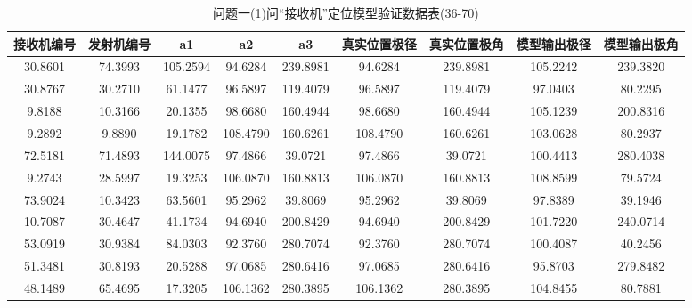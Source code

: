 \documentclass[withoutpreface,bwprint]{cumcmthesis}
\begin{document}
\begin{appendices}
		\begin{table}[htbp!]
			\caption{问题一(1)问“接收机”定位模型验证数据表(36-70)}
			\footnotesize
			\centering
			\centering
			\begin{tabular}{@{}ccccccccc@{}}
				\toprule
				\textbf{接收机编号} & \textbf{发射机编号} & \textbf{a1} & \textbf{a2} & \textbf{a3} & \textbf{真实位置极径} & \textbf{真实位置极角} & \textbf{模型输出极径} & \textbf{模型输出极角} \\ \midrule
				30.8601        & 74.3993        & 105.2594    & 94.6284     & 239.8981    & 94.6284         & 239.8981        & 105.2242        & 239.3820        \\
				30.8767        & 30.2710        & 61.1477     & 96.5897     & 119.4079    & 96.5897         & 119.4079        & 97.0403         & 80.2295         \\
				9.8188         & 10.3166        & 20.1355     & 98.6680     & 160.4944    & 98.6680         & 160.4944        & 105.1239        & 200.8316        \\
				9.2892         & 9.8890         & 19.1782     & 108.4790    & 160.6261    & 108.4790        & 160.6261        & 103.0628        & 80.2937         \\
				72.5181        & 71.4893        & 144.0075    & 97.4866     & 39.0721     & 97.4866         & 39.0721         & 100.4413        & 280.4038        \\
				9.2743         & 28.5997        & 19.3253     & 106.0870    & 160.8813    & 106.0870        & 160.8813        & 108.8599        & 79.5724         \\
				73.9024        & 10.3423        & 63.5601     & 95.2962     & 39.8069     & 95.2962         & 39.8069         & 97.8389         & 39.1946         \\
				10.7087        & 30.4647        & 41.1734     & 94.6940     & 200.8429    & 94.6940         & 200.8429        & 101.7220        & 240.0714        \\
				53.0919        & 30.9384        & 84.0303     & 92.3760     & 280.7074    & 92.3760         & 280.7074        & 100.4087        & 40.2456         \\
				51.3481        & 30.8193        & 20.5288     & 97.0685     & 280.6416    & 97.0685         & 280.6416        & 95.8703         & 279.8482        \\
				48.1489        & 65.4695        & 17.3205     & 106.1362    & 280.3895    & 106.1362        & 280.3895        & 104.8455        & 80.7881         \\

\end{tabular}
\end{table}
\end{appendices}
\end{document}
